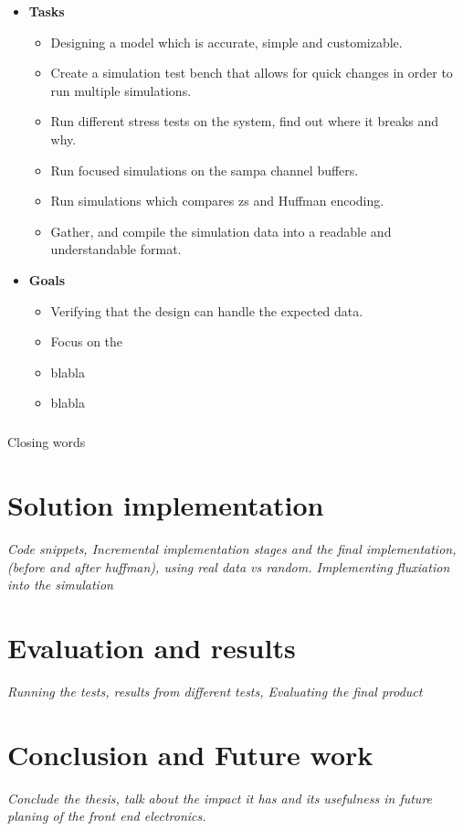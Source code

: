 \documentclass[a4paper, 12pt]{report}
\begin{document}
\begin{itemize}
	\item \textbf{Tasks}
		\begin{itemize}
			\item Designing a model which is accurate, simple and customizable.
			\item Create a simulation test bench that allows for quick changes in order to run multiple simulations.
			\item Run different stress tests on the system, find out where it breaks and why.
			\item Run focused simulations on the \gls{sampa} channel buffers.
			\item Run simulations which compares \gls{zs} and Huffman encoding.
			\item Gather, and compile the simulation data into a readable and understandable format.
		\end{itemize}
	\item \textbf{Goals}
	\begin{itemize}
		\item Verifying that the design can handle the expected data.
		\item Focus on the
		\item blabla
		\item blabla
	\end{itemize}
\end{itemize}

\paragraph{}
Closing words

\chapter{Solution implementation}
\textit{Code snippets, Incremental implementation stages and the final implementation, (before and after huffman), using real data vs random. Implementing fluxiation into the simulation}
\section{}


\chapter{Evaluation and results}
\textit{Running the tests, results from different tests, Evaluating the final product}

\chapter{Conclusion and Future work}
\textit{Conclude the thesis, talk about the impact it has and its usefulness in future planing of the front end electronics.}

{}

\end{document}
